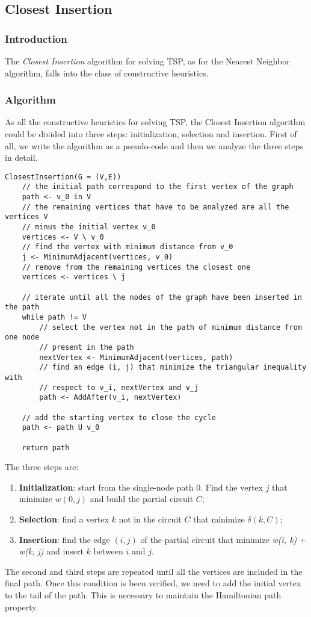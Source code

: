 \subsection{Closest Insertion}

\subsubsection{Introduction}
The \textit{Closest Insertion} algorithm for solving TSP, as for the Nearest Neighbor algorithm, falls into the class of constructive heuristics.

\subsubsection{Algorithm}
As all the constructive heuristics for solving TSP, the Closest Insertion algorithm could be divided into three steps: initialization, selection and insertion. First of all, we write the algorithm as a pseudo-code and then we analyze the three steps in detail.
\newpage
\begin{verbatim}
ClosestInsertion(G = (V,E))
    // the initial path correspond to the first vertex of the graph
    path <- v_0 in V
    // the remaining vertices that have to be analyzed are all the vertices V 
    // minus the initial vertex v_0
    vertices <- V \ v_0
    // find the vertex with minimum distance from v_0
    j <- MinimumAdjacent(vertices, v_0)
    // remove from the remaining vertices the closest one
    vertices <- vertices \ j
    
    // iterate until all the nodes of the graph have been inserted in the path
    while path != V
        // select the vertex not in the path of minimum distance from one node 
        // present in the path
        nextVertex <- MinimumAdjacent(vertices, path)
        // find an edge (i, j) that minimize the triangular inequality with 
        // respect to v_i, nextVertex and v_j
        path <- AddAfter(v_i, nextVertex)
    
    // add the starting vertex to close the cycle
    path <- path U v_0
    
    return path
\end{verbatim}
\noindent
The three steps are:
\begin{enumerate}
    \item \textbf{Initialization}: start from the single-node path 0. Find the vertex $j$ that minimize $w(0, j)$ and build the partial circuit $C$;
    \item \textbf{Selection}: find a vertex $k$ not in the circuit $C$ that minimize $\delta(k, C)$;
    \item \textbf{Insertion}: find the edge $(i, j)$ of the partial circuit that minimize \textit{w(i, k)} + \textit{w(k, j)}  and insert $k$ between $i$ and $j$.
\end{enumerate}
The second and third steps are repeated until all the vertices are included in the final path. Once this condition is been verified, we need to add the initial vertex to the tail of the path. This is necessary to maintain the Hamiltonian path property.

